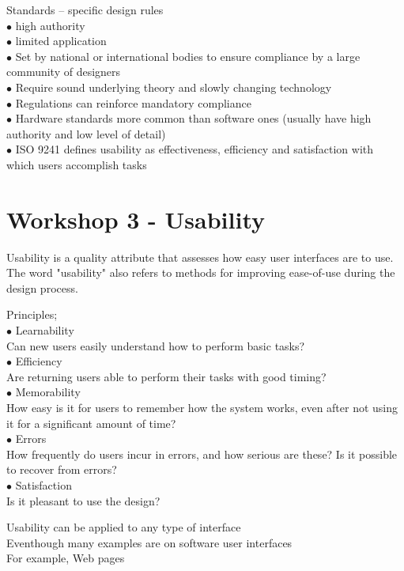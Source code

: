 \documentclass[]{project_plan}
\newcommand{\bulletPoint}{\hspace{-3.1pt}$\bullet$ \hspace{5pt}}
\begin{document}
\newpage

Standards – specific design rules\\
\bulletPoint high authority\\
\bulletPoint limited application\\
\bulletPoint Set by national or international bodies to ensure compliance by a large community of designers\\
\bulletPoint Require sound underlying theory and slowly changing technology\\
\bulletPoint Regulations can reinforce mandatory compliance\\
\bulletPoint Hardware standards more common than software ones (usually have high authority and low level of detail)\\
\bulletPoint ISO 9241 defines usability as effectiveness, efficiency and satisfaction with which users accomplish tasks

\chapter{Workshop 3 - Usability}
Usability is a quality attribute that assesses how easy user interfaces are to
use. The word "usability" also refers to methods for improving ease-of-use during
the design process.

Principles;\\
\bulletPoint Learnability\\
Can new users easily understand how to perform basic tasks?\\
\bulletPoint Efficiency\\
Are returning users able to perform their tasks with good timing?\\
\bulletPoint Memorability\\
How easy is it for users to remember how the system works, even after not using
it for a significant amount of time?\\
\bulletPoint Errors\\
How frequently do users incur in errors, and how serious are these? Is it possible to
recover from errors?\\
\bulletPoint Satisfaction\\
Is it pleasant to use the design?

Usability can be applied to any type of interface\\
Eventhough many examples are on software user interfaces\\
For example, Web pages
\end{document}

